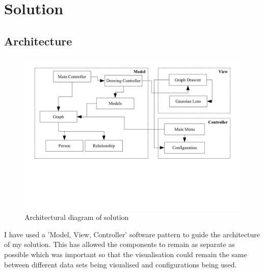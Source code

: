 \documentclass[12pt,a4paper]{article}
\begin{document}

\section{Solution}

\subsection{Architecture}

\begin{figure}[htb]
\centering
\caption{Architectural diagram of solution}
\label{fig:diagram}
\includegraphics[scale=0.75]{ArchitectureDiagram.pdf}
\end{figure}

\noindent
I have used a 'Model, View, Controller' software pattern to guide the architecture of my solution. This has allowed the components to remain as separate as possible which was important so that the visualisation could remain the same between different data sets being visualised and configurations being used.
\end{document}
